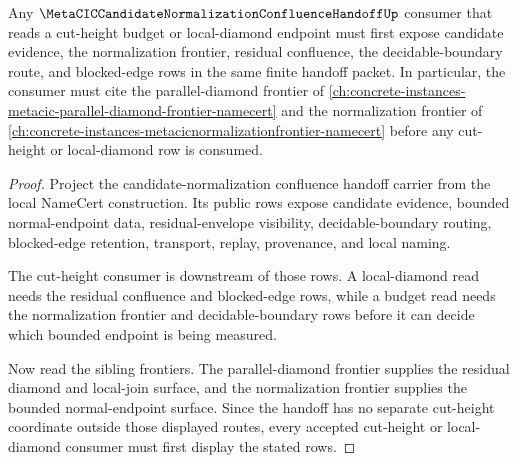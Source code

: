 \begin{theorem}
\label{thm:metacic-candidate-normalization-confluence-handoff-cut-height-budget}
Any $\MetaCICCandidateNormalizationConfluenceHandoffUp$ consumer that reads a cut-height budget or local-diamond endpoint must first expose candidate evidence, the normalization frontier, residual confluence, the decidable-boundary route, and blocked-edge rows in the same finite handoff packet. In particular, the consumer must cite the parallel-diamond frontier of \autoref{ch:concrete-instances-metacic-parallel-diamond-frontier-namecert} and the normalization frontier of \autoref{ch:concrete-instances-metacicnormalizationfrontier-namecert} before any cut-height or local-diamond row is consumed.
\end{theorem}
\begin{proof}
Project the candidate-normalization confluence handoff carrier from the local NameCert construction. Its public rows expose candidate evidence, bounded normal-endpoint data, residual-envelope visibility, decidable-boundary routing, blocked-edge retention, transport, replay, provenance, and local naming.

The cut-height consumer is downstream of those rows. A local-diamond read needs the residual confluence and blocked-edge rows, while a budget read needs the normalization frontier and decidable-boundary rows before it can decide which bounded endpoint is being measured.

Now read the sibling frontiers. The parallel-diamond frontier supplies the residual diamond and local-join surface, and the normalization frontier supplies the bounded normal-endpoint surface. Since the handoff has no separate cut-height coordinate outside those displayed routes, every accepted cut-height or local-diamond consumer must first display the stated rows.
\end{proof}
